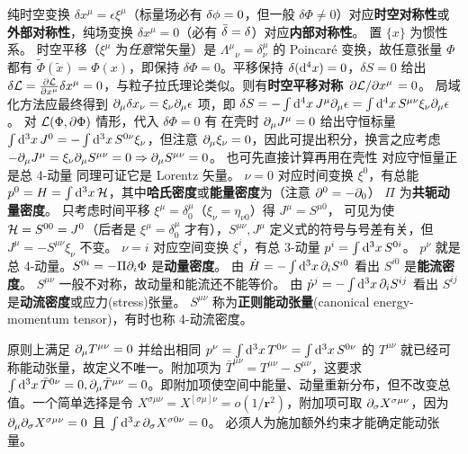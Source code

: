 纯时空变换 $\delta x^\mu=\epsilon \xi^\mu$（标量场必有 $\var\phi=0$，但一般 $\delta\Phi\ne 0$）对应\textbf{时空对称性}或\textbf{外部对称性}，纯场变换 $\delta x^\mu=0$（必有 $\bar\var=\delta$）对应\textbf{内部对称性}。
置 $\{x\}$ 为惯性系。
时空平移（$\xi^\mu$ 为\textit{任意}常矢量）是 $\Lambda^\mu{}_\nu=\delta^\mu_\nu$ 的 Poincaré 变换，故任意张量 $\Phi$ 都有 $\tilde\Phi(\tilde x)=\Phi(x)$，即保持 $\delta\Phi=0$。平移保持 $\delta(\dd[4] x)=0$，$\delta S=0$ 给出 $\delta\mathcal{L} = \pdv{\mathcal{L}}{x^\mu}\var x^\mu = 0$，与粒子拉氏理论类似。则有\textbf{时空平移对称} $\pdv*{\mathcal{L}}{x^\mu}=0$。
局域化方法应最终得到 $\partial_\mu\var x_\nu=\xi_\nu\partial_\mu \epsilon$ 项，即 $\delta S=-\int\dd[4]{x} J^\mu\partial_\mu \epsilon=\int\dd[4]{x} S^{\mu\nu}\xi_\nu\partial_\mu \epsilon$。
对 $\mathcal{L}(\Phi,\partial\Phi)$ 情形，代入 $\delta\Phi=0$ 有
在壳时 $\partial_\mu J^\mu=0$ 给出守恒标量 $\int\dd[3]{x} J^0 = - \int\dd[3]{x} S^{0\nu}\xi_\nu$，但注意 $\partial_\mu\xi_\nu=0$，因此可提出积分，换言之应考虑 $-\partial_\mu J^\mu = \xi_\nu\partial_\mu S^{\mu\nu} = 0\Rightarrow \partial_\mu S^{\mu\nu}=0$。
也可先直接计算再用在壳性
对应守恒量正是总 4-动量
同理可证它是 Lorentz 矢量。
$\nu=0$ 对应时间变换 $\xi^0$，有总能 $p^0=H= \int\dd[3]{x} \mathcal{H}$，其中\textbf{哈氏密度}或\textbf{能量密度}为（注意 $\partial^0=-\partial_0$）
$\Pi$ 为\textbf{共轭动量密度}。
只考虑时间平移 $\xi^\mu=\delta_0^\mu$（$\xi_\nu = \eta_{\nu 0}$）得 $J^\mu=S^{\mu 0}$，
可见为使 $\mathcal{H} = S^{00} = J^0$（后者是 $\xi^\mu=\delta_0^\mu$ 才有），$S^{\mu\nu},J^\mu$ 定义式的符号与号差有关，但 $J^\mu=-S^{\mu\nu}\xi_\nu$ 不变。
$\nu=i$ 对应空间变换 $\xi^i$，有总 3-动量 $p^i = \int\dd[3]{x}S^{0i}$。
$p^\nu$ 就是总 4-动量。$S^{0i}=-\Pi\partial_i\Phi$ 是\textbf{动量密度}。
由 $\dot H=-\int\dd[3]{x} \partial_i S^{i0}$ 看出 $S^{i0}$ 是\textbf{能流密度}。
$S^{\mu\nu}$ 一般不对称，故动量和能流还不能等价。
由 $\dot p^j = -\int\dd[3]{x} \partial_i S^{ij}$ 看出 $S^{ij}$ 是\textbf{动流密度}或应力(stress)张量。
$S^{\mu\nu}$ 称为\textbf{正则能动张量}(canonical energy-momentum tensor)，有时也称 4-动流密度。

原则上满足 $\partial_\mu T^{\mu\nu}=0$ 并给出相同 $p^\nu=\int\dd[3]{x}T^{0\nu}=\int\dd[3]{x}S^{0\nu}$ 的 $T^{\mu\nu}$ 就已经可称能动张量，故定义不唯一。附加项为 $\bar T^{\mu\nu} = T^{\mu\nu} - S^{\mu\nu}$，这要求 $\int\dd[3]{x}\bar T^{0\nu} = 0,\partial_\mu \bar T^{\mu\nu} = 0$。即附加项使空间中能量、动量重新分布，但不改变总值。一个简单选择是令 $X^{\sigma\mu\nu}=X^{[\sigma\mu]\nu}=o(1/\bm r^2)$，附加项可取 $\partial_\sigma X^{\sigma\mu\nu}$，因为 $\partial_\mu\partial_\sigma X^{\sigma\mu\nu} = 0$ 且 $\int\dd[3]{x} \partial_\sigma X^{\sigma 0 \nu} = 0$。
必须人为施加额外约束才能确定能动张量。





